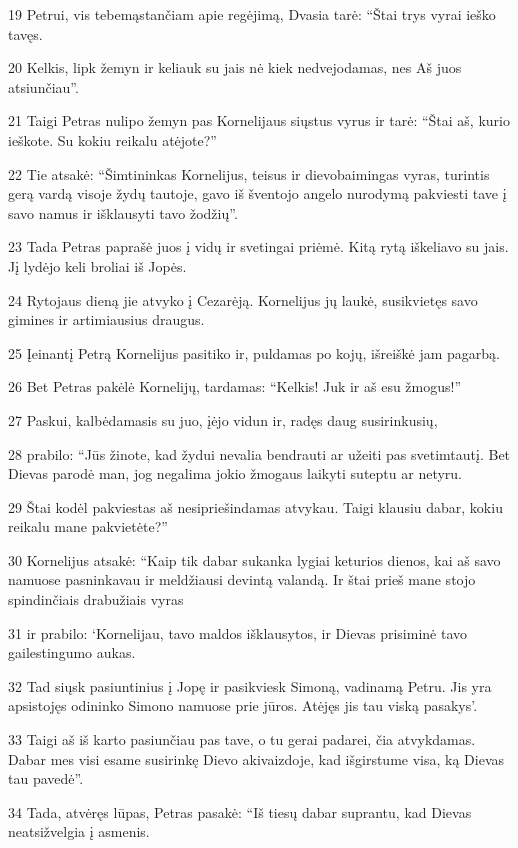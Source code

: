 \par 19 Petrui, vis tebemąstančiam apie regėjimą, Dvasia tarė: “Štai trys vyrai ieško tavęs. 
\par 20 Kelkis, lipk žemyn ir keliauk su jais nė kiek nedvejodamas, nes Aš juos atsiunčiau”. 
\par 21 Taigi Petras nulipo žemyn pas Kornelijaus siųstus vyrus ir tarė: “Štai aš, kurio ieškote. Su kokiu reikalu atėjote?” 
\par 22 Tie atsakė: “Šimtininkas Kornelijus, teisus ir dievobaimingas vyras, turintis gerą vardą visoje žydų tautoje, gavo iš šventojo angelo nurodymą pakviesti tave į savo namus ir išklausyti tavo žodžių”. 
\par 23 Tada Petras paprašė juos į vidų ir svetingai priėmė. Kitą rytą iškeliavo su jais. Jį lydėjo keli broliai iš Jopės. 
\par 24 Rytojaus dieną jie atvyko į Cezarėją. Kornelijus jų laukė, susikvietęs savo gimines ir artimiausius draugus. 
\par 25 Įeinantį Petrą Kornelijus pasitiko ir, puldamas po kojų, išreiškė jam pagarbą. 
\par 26 Bet Petras pakėlė Kornelijų, tardamas: “Kelkis! Juk ir aš esu žmogus!” 
\par 27 Paskui, kalbėdamasis su juo, įėjo vidun ir, radęs daug susirinkusių, 
\par 28 prabilo: “Jūs žinote, kad žydui nevalia bendrauti ar užeiti pas svetimtautį. Bet Dievas parodė man, jog negalima jokio žmogaus laikyti suteptu ar netyru. 
\par 29 Štai kodėl pakviestas aš nesipriešindamas atvykau. Taigi klausiu dabar, kokiu reikalu mane pakvietėte?” 
\par 30 Kornelijus atsakė: “Kaip tik dabar sukanka lygiai keturios dienos, kai aš savo namuose pasninkavau ir meldžiausi devintą valandą. Ir štai prieš mane stojo spindinčiais drabužiais vyras 
\par 31 ir prabilo: ‘Kornelijau, tavo maldos išklausytos, ir Dievas prisiminė tavo gailestingumo aukas. 
\par 32 Tad siųsk pasiuntinius į Jopę ir pasikviesk Simoną, vadinamą Petru. Jis yra apsistojęs odininko Simono namuose prie jūros. Atėjęs jis tau viską pasakys’. 
\par 33 Taigi aš iš karto pasiunčiau pas tave, o tu gerai padarei, čia atvykdamas. Dabar mes visi esame susirinkę Dievo akivaizdoje, kad išgirstume visa, ką Dievas tau pavedė”. 
\par 34 Tada, atvėręs lūpas, Petras pasakė: “Iš tiesų dabar suprantu, kad Dievas neatsižvelgia į asmenis. 
